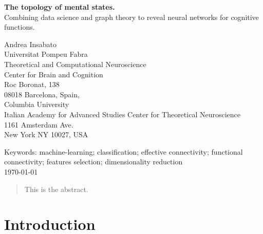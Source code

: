 \documentclass[12pt, a4paper, final, fleqn]{article}
\begin{document}
\begin{center}

\vspace*{2cm}

{ \Large {\bf The topology of mental states.} \\
Combining data science and graph theory to reveal neural networks for cognitive functions.}


\vspace*{2cm}

\large
Andrea Insabato\\[1 cm]

\normalsize
{Universitat Pompeu Fabra \\
Theoretical and Computational Neuroscience\\
Center for Brain and Cognition \\
Roc Boronat, 138\\
08018 Barcelona, Spain,} \\[1 cm]

\normalsize
{Columbia University \\
Italian Academy for Advanced Studies
Center for Theoretical Neuroscience\\
1161 Amsterdam Ave.\\
New York NY 10027, USA} \\[1 cm]

\end{center}

\vfill
Keywords:  machine-learning; classification; effective connectivity; functional connectivity; features selection; dimensionality reduction\\
\today


\newpage
\doublespacing
\begin{abstract}
This is the abstract.
\end{abstract}

\newpage
\tableofcontents
\newpage
\section{Introduction}
\label{intro}
\end{document}
